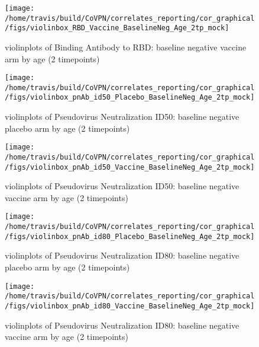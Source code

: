 \documentclass[]{book}
\theoremstyle{definition}
\theoremstyle{definition}
\theoremstyle{definition}
\newcommand{\1}{\mathbbm{1}}
\begin{document}
\clearpage
\begin{figure}[H]

{\centering \texttt{[image: /home/travis/build/CoVPN/correlates\_reporting/cor\_graphical/figs/violinbox\_RBD\_Vaccine\_BaselineNeg\_Age\_2tp\_mock]} 

}

\caption{violinplots of Binding Antibody to RBD: baseline negative vaccine arm by age (2 timepoints)}\label{fig:unnamed-chunk-70}
\end{figure}

\clearpage
\begin{figure}[H]

{\centering \texttt{[image: /home/travis/build/CoVPN/correlates\_reporting/cor\_graphical/figs/violinbox\_pnAb\_id50\_Placebo\_BaselineNeg\_Age\_2tp\_mock]} 

}

\caption{violinplots of Pseudovirus Neutralization ID50: baseline negative placebo arm by age (2 timepoints)}\label{fig:unnamed-chunk-71}
\end{figure}

\clearpage
\begin{figure}[H]

{\centering \texttt{[image: /home/travis/build/CoVPN/correlates\_reporting/cor\_graphical/figs/violinbox\_pnAb\_id50\_Vaccine\_BaselineNeg\_Age\_2tp\_mock]} 

}

\caption{violinplots of Pseudovirus Neutralization ID50: baseline negative vaccine arm by age (2 timepoints)}\label{fig:unnamed-chunk-72}
\end{figure}

\clearpage
\begin{figure}[H]

{\centering \texttt{[image: /home/travis/build/CoVPN/correlates\_reporting/cor\_graphical/figs/violinbox\_pnAb\_id80\_Placebo\_BaselineNeg\_Age\_2tp\_mock]} 

}

\caption{violinplots of Pseudovirus Neutralization ID80: baseline negative placebo arm by age (2 timepoints)}\label{fig:unnamed-chunk-73}
\end{figure}

\clearpage
\begin{figure}[H]

{\centering \texttt{[image: /home/travis/build/CoVPN/correlates\_reporting/cor\_graphical/figs/violinbox\_pnAb\_id80\_Vaccine\_BaselineNeg\_Age\_2tp\_mock]} 

}

\caption{violinplots of Pseudovirus Neutralization ID80: baseline negative vaccine arm by age (2 timepoints)}\label{fig:unnamed-chunk-74}
\end{figure}
\end{document}
